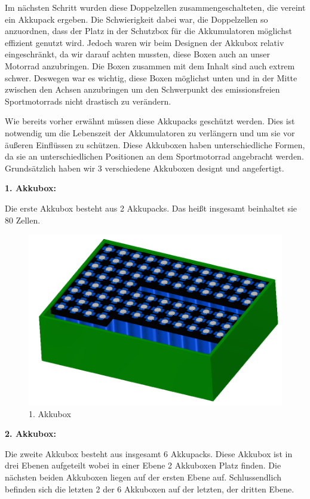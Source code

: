 Im nächsten Schritt wurden diese Doppelzellen zusammengeschalteten, die vereint ein Akkupack ergeben. Die Schwierigkeit dabei war, die Doppelzellen so anzuordnen, dass der Platz in der Schutzbox für die Akkumulatoren möglichst effizient genutzt wird. Jedoch waren wir beim Designen der Akkubox relativ eingeschränkt, da wir darauf achten mussten, diese Boxen auch an unser Motorrad anzubringen. Die Boxen zusammen mit dem Inhalt sind auch extrem schwer. Deswegen war es wichtig, diese Boxen möglichst unten und in der Mitte zwischen den Achsen anzubringen um den Schwerpunkt des emissionsfreien Sportmotorrads nicht drastisch zu verändern.

Wie bereits vorher erwähnt müssen diese Akkupacks geschützt werden. Dies ist notwendig um die Lebenszeit der Akkumulatoren zu verlängern und um sie vor äußeren Einflüssen zu schützen. Diese Akkuboxen haben unterschiedliche Formen, da sie an unterschiedlichen Positionen an dem Sportmotorrad angebracht werden. Grundsätzlich haben wir 3 verschiedene Akkuboxen designt und angefertigt.
\newpage

\textbf{1. Akkubox:}

Die erste Akkubox besteht aus 2 Akkupacks. Das heißt insgesamt beinhaltet sie 80 Zellen.

\begin{figure}[H]
	\begin{center}
		\includegraphics[scale=0.5]{figures/Akku/Akkubox1.PNG}
		\caption{1. Akkubox}
		\label{fig: 1. Akkubox}
	\end{center}
\end{figure}

\textbf{2. Akkubox:}

Die zweite Akkubox besteht aus insgesamt 6 Akkupacks. Diese Akkubox ist in drei Ebenen aufgeteilt wobei in einer Ebene 2 Akkuboxen Platz finden. Die nächsten beiden Akkuboxen liegen auf der ersten Ebene auf. Schlussendlich befinden sich die letzten 2 der 6 Akkuboxen auf der letzten, der dritten Ebene.



